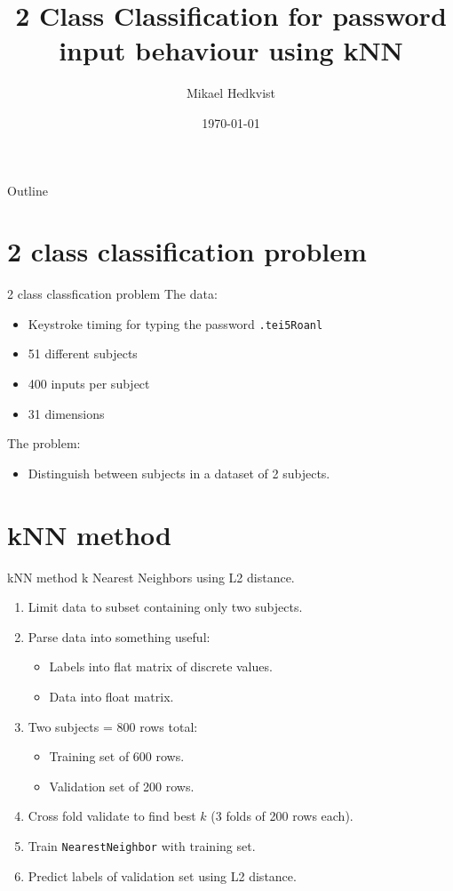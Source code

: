 \documentclass{beamer}
\title[D7041E]{2 Class Classification for password input behaviour using kNN}
\author{Mikael Hedkvist}
\institute{}
\date{\today}
\begin{document}
\begin{frame}
\titlepage
\end{frame}

\begin{frame}{Outline}
\tableofcontents
\end{frame}

\section{2 class classification problem}
\begin{frame}{2 class classfication problem}
	The data:
	\begin{itemize}
		\item Keystroke timing for typing the password \texttt{.tei5Roanl}
		\item 51 different subjects
		\item 400 inputs per subject
		\item 31 dimensions
	\end{itemize}
	The problem:
	\begin{itemize}
		\item Distinguish between subjects in a dataset of 2 subjects.
	\end{itemize}
\end{frame}

\section{kNN method}
\begin{frame}{kNN method}
	k Nearest Neighbors using L2 distance.
	\begin{enumerate}
		\item Limit data to subset containing only two subjects.
		\item Parse data into something useful:
		\begin{itemize}
			\item Labels into flat matrix of discrete values.
			\item Data into float matrix.
		\end{itemize}
		\item Two subjects = 800 rows total:	
		\begin{itemize}
			\item Training set of 600 rows.
			\item Validation set of 200 rows.
		\end{itemize}
		\item Cross fold validate to find best $k$ (3 folds of 200 rows each).
		\item Train \texttt{NearestNeighbor} with training set.
		\item Predict labels of validation set using L2 distance.
	\end{enumerate}
\end{frame}
\end{document}

